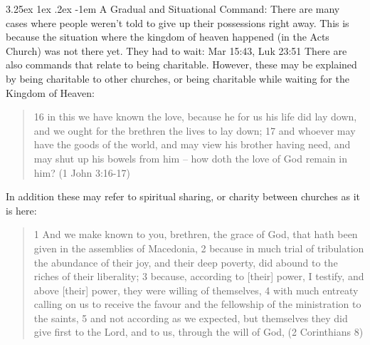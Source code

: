 \documentclass[11pt]{article}
\makeatletter
\renewcommand\paragraph{\@startsection{paragraph}{5}{\z@}%
  {3.25ex \@plus1ex \@minus.2ex}%
  {-1em}%
  {\normalfont\normalsize\bfseries}}
\makeatother
\begin{document}
\paragraph{A Gradual and Situational Command:} There are many cases where people weren't told to give up their possessions right away. This is because the situation where the kingdom of heaven happened (in the Acts Church) was not there yet. They had to wait: Mar 15:43, Luk 23:51 There are also commands that relate to being charitable. However, these may be explained by being charitable to other churches, or being charitable while waiting for the Kingdom of Heaven: 
\begin{quote}
16 in this we have known the love, because he for us his life did lay down, and we ought for the brethren the lives to lay down; 17 and whoever may have the goods of the world, and may view his brother having need, and may shut up his bowels from him -- how doth the love of God remain in him? (1 John 3:16-17)
\end{quote}
In addition these may refer to spiritual sharing, or charity between churches as it is here:
\begin{quote}
1 And we make known to you, brethren, the grace of God, that hath been given in the assemblies of Macedonia,
2 because in much trial of tribulation the abundance of their joy, and their deep poverty, did abound to the riches of their liberality;
3 because, according to [their] power, I testify, and above [their] power, they were willing of themselves,
4 with much entreaty calling on us to receive the favour and the fellowship of the ministration to the saints,
5 and not according as we expected, but themselves they did give first to the Lord, and to us, through the will of God, (2 Corinthians 8)
\end{quote}
\end{document}
